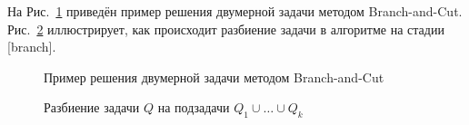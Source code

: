 \documentclass[a4paper,14pt,russian]{extreport}
\begin{document}
\par На Рис.~\ref{ris:example} приведён пример решения двумерной задачи методом Branch-and-Cut. Рис.~\ref{ris:branching} иллюстрирует, как происходит разбиение задачи в алгоритме на стадии [branch].
\par
  \begin{figure}[h]
  \caption{Пример решения двумерной задачи методом Branch-and-Cut}
  \label{ris:example}
  \end{figure}
\par
  \begin{figure}[h]
  \caption{Разбиение задачи $Q$ на подзадачи $Q_1 \cup \dots \cup Q_k$}
  \label{ris:branching}
  \end{figure}
\end{document}

